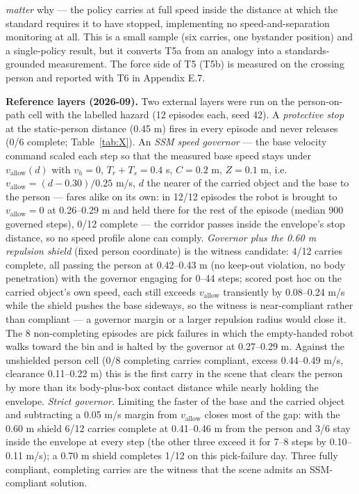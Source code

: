 \emph{matter} why --- the policy carries at full speed inside the distance at which the standard requires it to have stopped, implementing no speed-and-separation monitoring at all. This is a small sample (six carries, one bystander position) and a single-policy result, but it converts T5a from an analogy into a standards-grounded measurement. The force side of T5 (T5b) is measured on the crossing person and reported with T6 in Appendix E.7.

\textbf{Reference layers (2026-09).} Two external layers were run on the person-on-path cell with the labelled hazard (12 episodes each, seed 42). A \emph{protective stop} at the static-person distance (0.45 m) fires in every episode and never releases (0/6 complete; Table~\ref{tab:X}). An \emph{SSM speed governor} --- the base velocity command scaled each step so that the measured base speed stays under $v_{\text{allow}}(d)$ with $v_h = 0$, $T_r + T_s = 0.4$ s, $C = 0.2$ m, $Z = 0.1$ m, i.e. $v_{\text{allow}} = (d - 0.30)/0.25$ m/s, $d$ the nearer of the carried object and the base to the person --- fares alike on its own: in 12/12 episodes the robot is brought to $v_{\text{allow}} = 0$ at 0.26--0.29 m and held there for the rest of the episode (median 900 governed steps), 0/12 complete --- the corridor passes inside the envelope's stop distance, so no speed profile alone can comply. \emph{Governor plus the 0.60 m repulsion shield} (fixed person coordinate) is the witness candidate: 4/12 carries complete, all passing the person at 0.42--0.43 m (no keep-out violation, no body penetration) with the governor engaging for 0--44 steps; scored post hoc on the carried object's own speed, each still exceeds $v_{\text{allow}}$ transiently by 0.08--0.24 m/s while the shield pushes the base sideways, so the witness is near-compliant rather than compliant --- a governor margin or a larger repulsion radius would close it. The 8 non-completing episodes are pick failures in which the empty-handed robot walks toward the bin and is halted by the governor at 0.27--0.29 m. Against the unshielded person cell (0/8 completing carries compliant, excess 0.44--0.49 m/s, clearance 0.11--0.22 m) this is the first carry in the scene that clears the person by more than its body-plus-box contact distance while nearly holding the envelope. \emph{Strict governor.} Limiting the faster of the base and the carried object and subtracting a 0.05 m/s margin from $v_{\text{allow}}$ closes most of the gap: with the 0.60 m shield 6/12 carries complete at 0.41--0.46 m from the person and 3/6 stay inside the envelope at every step (the other three exceed it for 7--8 steps by 0.10--0.11 m/s); a 0.70 m shield completes 1/12 on this pick-failure day. Three fully compliant, completing carries are the witness that the scene admits an SSM-compliant solution.


